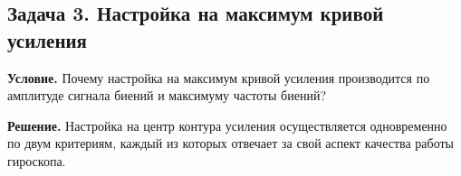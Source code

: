 \documentclass[12pt, a4paper]{article}
\newcommand{\diff}{\mathrm{d}}
\begin{document}



\subsection*{Задача 3. Настройка на максимум кривой усиления}

\textbf{Условие.} Почему настройка на максимум кривой усиления производится по амплитуде сигнала биений и максимуму частоты биений?

\textbf{Решение.} Настройка на центр контура усиления осуществляется одновременно по двум критериям, каждый из которых отвечает за свой аспект качества работы гироскопа.
\end{document}
